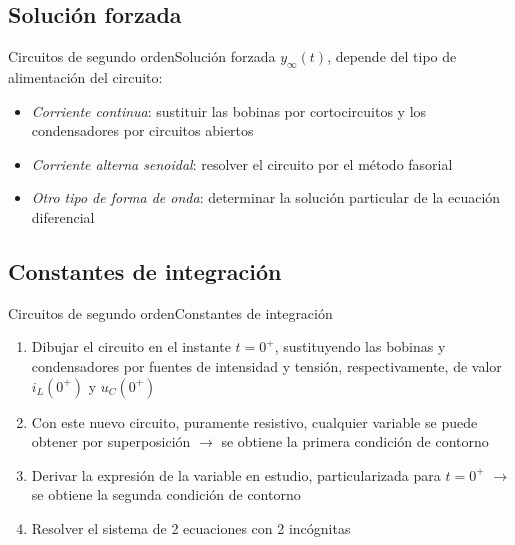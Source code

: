 \documentclass[aspectratio=169, xcolor={usenames,svgnames,dvipsnames}]{beamer}
\begin{document}
\subsection{Solución forzada}
\begin{frame}{Circuitos de segundo orden}{Solución forzada}
    $y_\infty(t)$, depende del tipo de alimentación del circuito:
	\begin{itemize}
	        \item \textit{Corriente continua}: sustituir las bobinas por cortocircuitos y los condensadores por circuitos abiertos
	        \item \textit{Corriente alterna senoidal}: resolver el circuito por el método fasorial
	        \item \textit{Otro tipo de forma de onda}: determinar la solución particular de la ecuación diferencial
	    \end{itemize}
\end{frame}

\subsection{Constantes de integración}

\begin{frame}{Circuitos de segundo orden}{Constantes de integración}
    \begin{enumerate}
	    \item Dibujar el circuito en el instante $t=0^+$, sustituyendo las bobinas y condensadores por fuentes de intensidad y tensión, respectivamente, de valor $i_L(0^+)$ y $u_C(0^+)$
	    \item Con este nuevo circuito, puramente resistivo, cualquier variable se puede obtener por superposición $\rightarrow$ se obtiene la primera condición de contorno
	    \item Derivar la expresión de la variable en estudio, particularizada para $t=0^+$ $\rightarrow$ se obtiene la segunda condición de contorno
	    \item Resolver el sistema de 2 ecuaciones con 2 incógnitas
	\end{enumerate}
\end{frame}
\end{document}
